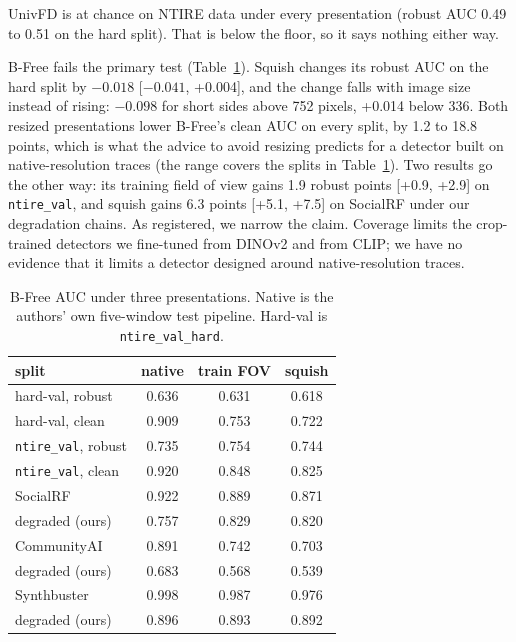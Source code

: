 \documentclass[letterpaper]{article} %
\begin{document}
UnivFD is at chance on NTIRE data under every presentation (robust AUC 0.49 to
0.51 on the hard split). That is below the floor, so it says nothing either
way.

B-Free fails the primary test (Table~\ref{tab:public}). Squish changes its
robust AUC on the hard split by $-0.018$ [$-0.041$, +0.004], and the change
falls with image size instead of rising: $-0.098$ for short sides above 752
pixels, +0.014 below 336. Both resized presentations lower B-Free's clean AUC
on every split, by 1.2 to 18.8 points, which is what the advice to avoid
resizing predicts for a detector built on native-resolution traces (the
range covers the splits in Table~\ref{tab:public}). Two
results go the other way: its training field of view gains 1.9 robust points
[+0.9, +2.9] on \texttt{ntire\_val}, and squish gains 6.3 points [+5.1, +7.5]
on SocialRF under our degradation chains. As registered, we narrow the claim.
Coverage limits the crop-trained detectors we fine-tuned from DINOv2 and from
CLIP; we have no evidence that it limits a detector designed around
native-resolution traces.

\begin{table}[t]
\centering
\small
\setlength{\tabcolsep}{4pt}
\begin{tabular}{lccc}
\toprule
split & native & train FOV & squish \\
\midrule
hard-val, robust & 0.636 & 0.631 & 0.618 \\
hard-val, clean & 0.909 & 0.753 & 0.722 \\
\texttt{ntire\_val}, robust & 0.735 & 0.754 & 0.744 \\
\texttt{ntire\_val}, clean & 0.920 & 0.848 & 0.825 \\
\midrule
SocialRF & 0.922 & 0.889 & 0.871 \\
\quad degraded (ours) & 0.757 & 0.829 & 0.820 \\
CommunityAI & 0.891 & 0.742 & 0.703 \\
\quad degraded (ours) & 0.683 & 0.568 & 0.539 \\
Synthbuster & 0.998 & 0.987 & 0.976 \\
\quad degraded (ours) & 0.896 & 0.893 & 0.892 \\
\bottomrule
\end{tabular}
\caption{B-Free AUC under three presentations. Native is the authors' own
five-window test pipeline. Hard-val is \texttt{ntire\_val\_hard}.}
\label{tab:public}
\end{table}
\end{document}
